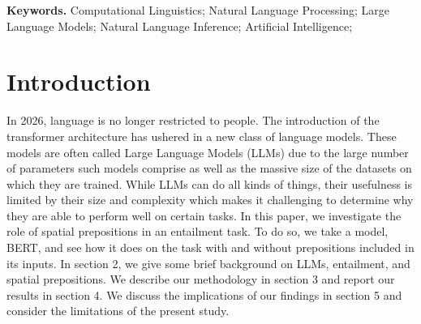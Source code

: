 \documentclass[12pt,letterpaper]{article}
\newenvironment{keywords}{%
\vspace{.5em}
\noindent\begin{minipage}{1\textwidth}
\setlength{\leftskip}{0.4in}
\setlength{\rightskip}{0.4in}
\textbf{Keywords.}}
{\end{minipage}}
\begin{document}
\begin{keywords} %
Computational Linguistics; Natural Language Processing; Large Language Models; Natural Language Inference; Artificial Intelligence; 
\end{keywords}

\section{Introduction} %



In 2026, language is no longer restricted to people. The introduction of the transformer architecture \citep{vaswani_attention_2017} has ushered in a new class of language models. These models are often called Large Language Models (LLMs) due to the large number of parameters such models comprise as well as the massive size of the datasets on which they are trained. While LLMs can do all kinds of things, their usefulness is limited by their size and complexity which makes it challenging to determine why they are able to perform well on certain tasks. In this paper, we investigate the role of spatial prepositions in an entailment task. To do so, we take a model, BERT, and see how it does on the task with and without prepositions included in its inputs. In section 2, we give some brief background on LLMs, entailment, and spatial prepositions. We describe our methodology in section 3 and report our results in section 4. We discuss the implications of our findings in section 5 and consider the limitations of the present study. 






\end{document}
